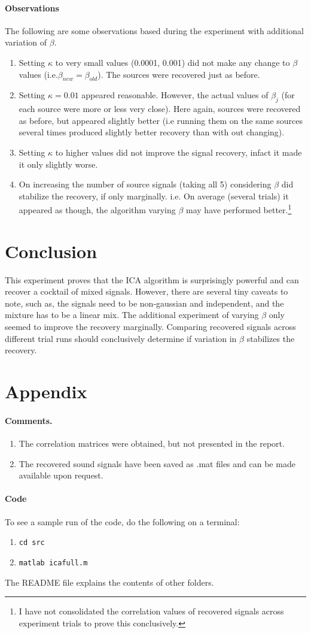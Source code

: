 \documentclass[11pt]{article}
\begin{document}
\paragraph{Observations}
The following are some observations based during the experiment with additional variation of $\beta$.
\begin{enumerate}
\item Setting $\kappa$ to very small values (0.0001, 0.001) did not make any change to $\beta$ values (i.e.$\beta_{new} = \beta_{old}$). The sources were recovered just as before.
\item Setting $\kappa = 0.01$ appeared reasonable. However, the actual values of $\beta_j$ (for each source were more or less very close). Here again, sources were recovered as before, but appeared slightly better (i.e running them on the same sources several times produced slightly better recovery than with out changing).
\item Setting $\kappa$ to higher values did not improve the signal recovery, infact it made it only slightly worse.
\item On increasing the number of source signals (taking all 5) considering $\beta$ did stabilize the recovery, if only marginally. i.e. On average (several trials) it appeared as though, the algorithm varying $\beta$ may have performed better.\footnote{I have not consolidated the correlation values of recovered signals across experiment trials to prove this conclusively.}
\end{enumerate}

\section{Conclusion}
This experiment proves that the ICA algorithm is surprisingly powerful and can recover a cocktail of mixed signals. However, there are several tiny caveats to note, such as, the signals need to be non-gaussian and independent, and the mixture has to be a linear mix. The additional experiment of varying $\beta$ only seemed to improve the recovery marginally. Comparing recovered signals across different trial runs should conclusively determine if variation in $\beta$ stabilizes the recovery.

\section{Appendix}
\paragraph{Comments.} 
\begin{enumerate}
\item The correlation matrices were obtained, but not presented in the report.
\item The recovered sound signals have been saved as .mat files and can be made available upon request.
\end{enumerate}

\paragraph{Code}
To see a sample run of the code, do the following on a terminal:
\begin{enumerate}
\item \tt{cd src}
\item \tt{matlab icafull.m}
\end{enumerate}
The README file explains the contents of other folders.
\end{document}
